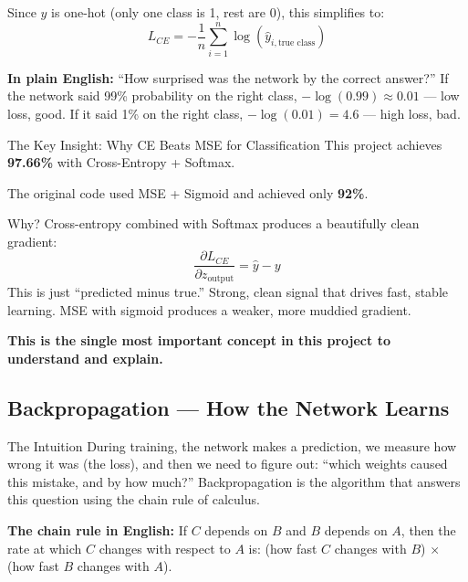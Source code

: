 \documentclass[12pt, a4paper]{article}
\begin{document}
Since $y$ is one-hot (only one class is 1, rest are 0), this simplifies to:
\begin{equation}
  L_{CE} = -\frac{1}{n} \sum_{i=1}^{n} \log(\hat{y}_{i, \text{true class}})
\end{equation}

\textbf{In plain English:} ``How surprised was the network by the correct answer?'' If the network said 99\% probability on the right class, $-\log(0.99) \approx 0.01$ --- low loss, good. If it said 1\% on the right class, $-\log(0.01) = 4.6$ --- high loss, bad.

\begin{keybox}{The Key Insight: Why CE Beats MSE for Classification}
This project achieves \textbf{97.66\%} with Cross-Entropy + Softmax.

The original code used MSE + Sigmoid and achieved only \textbf{92\%}.

Why? Cross-entropy combined with Softmax produces a beautifully clean gradient:
\begin{equation}
  \frac{\partial L_{CE}}{\partial z_{\text{output}}} = \hat{y} - y
\end{equation}
This is just ``predicted minus true.'' Strong, clean signal that drives fast, stable learning. MSE with sigmoid produces a weaker, more muddied gradient.

\textbf{This is the single most important concept in this project to understand and explain.}
\end{keybox}

\subsection{Backpropagation --- How the Network Learns}

\begin{conceptbox}{The Intuition}
During training, the network makes a prediction, we measure how wrong it was (the loss), and then we need to figure out: ``which weights caused this mistake, and by how much?'' Backpropagation is the algorithm that answers this question using the chain rule of calculus.
\end{conceptbox}

\textbf{The chain rule in English:} If $C$ depends on $B$ and $B$ depends on $A$, then the rate at which $C$ changes with respect to $A$ is: (how fast $C$ changes with $B$) $\times$ (how fast $B$ changes with $A$).
\end{document}
